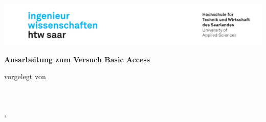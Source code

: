 \begin{titlepage}\linespread{1.5}\selectfont
\includegraphics[width=\linewidth]{Graphics/htwsaar_Logo_inwi_head_VF_4C_crop}
  \begin{center}
    \large  
    \hfill
    \vfill
    \begingroup
      \Large\bfseries\huge Ausarbeitung zum Versuch
    \endgroup
	\hfill
    \vfill
    \begingroup
      \Large\bfseries\huge Basic Access
    \endgroup
% 		
%     
   \vfill
% 
% 
	
  vorgelegt von \\
  \vspace{\baselineskip}
  \NameL\\
  \NameY\\
	
  \vfill
	
% 	
  \vfill
	
  \myLocation, \myTime                   

    \end{center}       
\end{titlepage}   